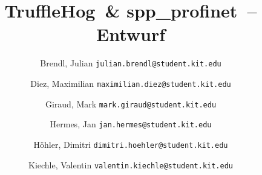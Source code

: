 \documentclass[listof=totoc,a4paper]{scrreprt}
\newcounter{savepage}
\newcommand{\sppname}{spp\_profinet}
\newcommand{\programname}{TruffleHog}
\begin{document}
\title{\programname \ \& \sppname \ -- Entwurf}
\author{
    Brendl, Julian
    \texttt{julian.brendl@student.kit.edu}
    \and
    Diez, Maximilian
    \texttt{maximilian.diez@student.kit.edu}
    \and
    Giraud, Mark
    \texttt{mark.giraud@student.kit.edu}
    \and
    Hermes, Jan
    \texttt{jan.hermes@student.kit.edu}
    \and
    Höhler, Dimitri
    \texttt{dimitri.hoehler@student.kit.edu}
    \and
    Kiechle, Valentin
    \texttt{valentin.kiechle@student.kit.edu}
}

\titlehead{\texttt{[image: images/title.png]}}

\maketitle

\setcounter{page}{2}

\newpage
\tableofcontents
\newpage
\listoffigures

\printglossary[title=Abkürzungsverzeichnis,toctitle=Abkürzungsverzeichnis,type=acronym]

\clearpage
{}
\setcounter{page}{\thesavepage}













\appendix

\printglossary[title=Glossar,toctitle=Glossar]
\end{document}
